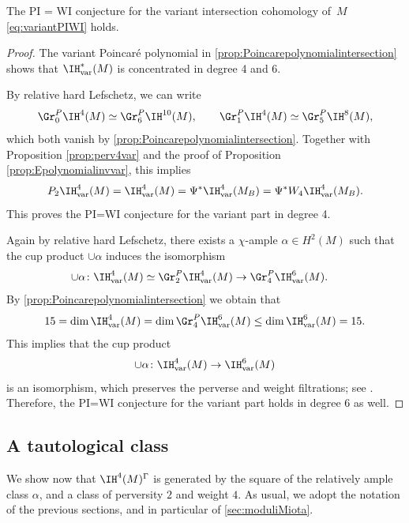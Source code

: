 \begin{thm}\label{PI=WIvariant}
The PI = WI conjecture for the variant intersection cohomology of~$M$ \eqref{eq:variantPIWI} holds.
\end{thm}
\begin{proof}
The variant Poincaré polynomial in \cref{prop:Poincarepolynomialintersection} shows that $\IH^*_{\mathrm{var}}(M)$ is concentrated in degree 4 and 6.

By relative hard Lefschetz, we can write\vspace*{-3pt}
\[
\Gr^P_0 \IH^4(M)\simeq \Gr^P_{6} \IH^{10}(M), \qquad
\Gr^P_1 \IH^4(M)\simeq \Gr^P_{5} \IH^{8}(M),
\]
which both vanish by \cref{prop:Poincarepolynomialintersection}. Together with Proposition \ref{prop:perv4var} and the proof of Proposition \ref{prop:Epolynomialinvvar}, this implies\vspace*{-3pt}
\[
P_2 \IH_{\mathrm{var}}^4(M) = \IH_{\mathrm{var}}^4(M) = \Psi^* \IH_{\mathrm{var}}^4(M_B) = \Psi^*W_4 \IH_{\mathrm{var}}^4(M_B).
\]
This proves the PI=WI conjecture for the variant part in degree 4.

Again by relative hard Lefschetz, there exists a $\chi$-ample $\alpha \in H^{2}(M)$ such that the cup product $\cup \alpha$
induces the isomorphism
\begin{align*}
\cup \alpha\colon \IH_{\mathrm{var}}^4(M) \simeq \Gr^P_2 \IH_{\mathrm{var}}^4(M) & \to \Gr^P_4 \IH^6_{\mathrm{var}}(M).
\end{align*}
By \cref{prop:Poincarepolynomialintersection} we obtain that
\[
15 = \dim \IH_{\mathrm{var}}^4(M) = \dim \Gr^P_4 \IH^6_{\mathrm{var}}(M) \leq \dim \IH_{\mathrm{var}}^6(M)=15.
\]
This implies that the cup product
\[
\cup \alpha\colon \IH^4_{\mathrm{var}}(M) \to \IH^6_{\mathrm{var}}(M)
\]
is an isomorphism, which preserves the perverse and weight filtrations; see \cite[Lem.\,1.4.4]{deCataldoHauselMigliorini2012}. Therefore, the PI=WI conjecture for the variant part holds in degree $6$ as well.
\end{proof}

\subsection{A tautological class}\label{sec:a tautological class}
We show now that $\IH^4(M)^{\Gamma}$ is generated by the square of the relatively ample class $\alpha$, and a class of perversity $2$ and weight $4$. As usual, we adopt the notation of the previous sections, and in particular of \cref{sec:moduliMiota}.

